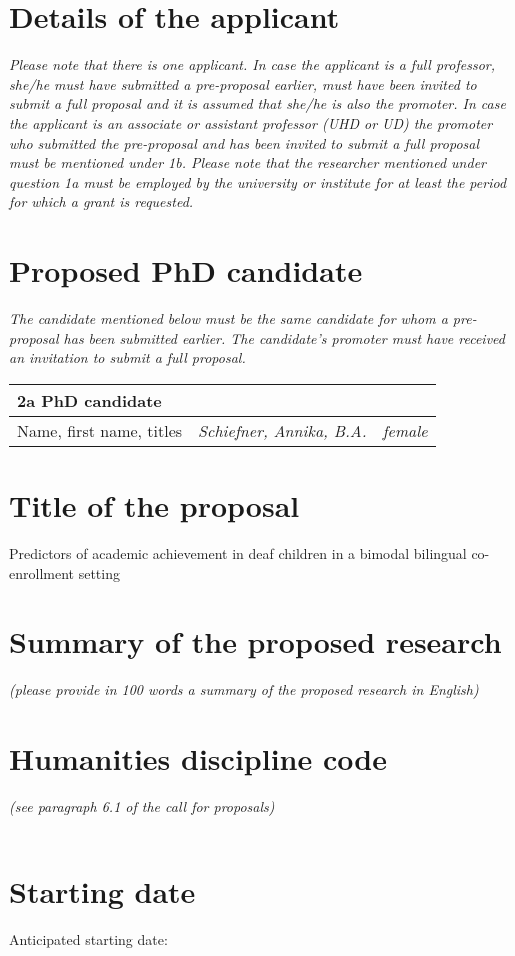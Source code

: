 \noindent{}

\section{Details of the applicant}
\textit{Please note that there is one applicant. In case the applicant is a full professor, she/he must have submitted a pre-proposal earlier, must have been invited to submit a full proposal and it is assumed that she/he is also the promoter. In case the applicant is an associate or assistant professor (UHD or UD) the promoter who submitted the pre-proposal and has been invited to submit a full proposal must be mentioned under 1b. Please note that the researcher mentioned under question 1a must be employed by the university or institute for at least the period for which a grant is requested.}

\section{Proposed PhD candidate}
\textit{The candidate mentioned below must be the same candidate for whom a pre-proposal has been submitted earlier. The candidate’s promoter must have received an invitation to submit a full proposal.}

\vspace{12pt}

\begin{tabular}{p{2cm}|l|l}
\hline
	\multicolumn{3}{l}{\textbf{2a PhD candidate}} \\
\hline
	Name, first name, titles & \textit{Schiefner, Annika, B.A.} & \textit{female} \\
\hline
\end{tabular}

\section{Title of the proposal}
Predictors of academic achievement in deaf children in a bimodal bilingual co-enrollment setting

\section{Summary of the proposed research}
\textit{(please provide in 100 words a summary of the proposed research in English)}


\section{Humanities discipline code}
\textit{(see paragraph 6.1 of the call for proposals)}

\begin{tabular}{|c|c|c|c|c|c|}
\hline
 &&&&& \\
\hline
\end{tabular}

\section{Starting date}
Anticipated starting date: 